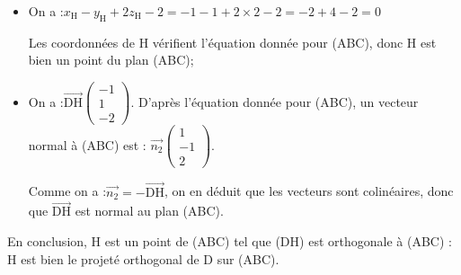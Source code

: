 \documentclass[10pt]{article}
\providecommand{\vect}[1]{\overrightarrow{#1}}
\begin{document}
\begin{itemize}
	\item On a :\quad $x_\mathrm{H} - y_{\mathrm{H}} +2z_{\mathrm{H}} - 2 = -1 - 1 + 2\times 2 - 2 = -2 + 4 - 2 = 0$

	Les coordonnées de H vérifient l'équation donnée pour (ABC), donc H est bien un point du plan (ABC);

	\item On a :\quad $\vect{\mathrm{DH}}\begin{pmatrix} -1\\1\\-2	\end{pmatrix}$.
	\qquad
	D'après l'équation donnée pour (ABC), un vecteur normal à (ABC) est :
	\quad
	$\vect{n_2} \begin{pmatrix} 1\\-1\\2	\end{pmatrix}$.

	Comme on a :\quad $\vect{n_2} = -\vect{\mathrm{DH}}$, \quad on en déduit que les vecteurs sont colinéaires, donc que $\vect{\mathrm{DH}}$ est normal au plan (ABC).
\end{itemize}

En conclusion, H est un point de (ABC) tel que (DH) est orthogonale à (ABC) : H est bien le projeté orthogonal de D sur (ABC).
\end{document}
